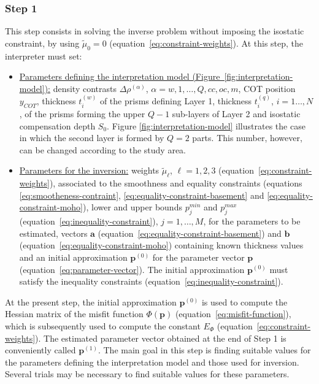 \documentclass[manuscript]{geophysics}
\begin{document}
\subsubsection{Step 1}

This step consists in solving the inverse problem without imposing 
the isostatic constraint, by using $\tilde{\mu}_{0} = 0$ 
(equation~\ref{eq:constraint-weights}). 
At this step, the interpreter must set:
\begin{itemize}
	\item \underline{Parameters defining the interpretation model
	(Figure~\ref{fig:interpretation-model}):} density contrasts $\Delta \rho^{(\alpha)}$, 
	$\alpha = w, 1, \dots, Q, cc, oc, m$, COT position $y_{COT}$, thickness $t^{(w)}_{i}$ 
	of the prisms defining Layer 1, thickness $t^{(q)}_{i}$, $i = 1 \dots, N$, of the prisms
	forming the upper $Q-1$ sub-layers of Layer 2 and isostatic compensation depth $S_{0}$. 
	Figure \ref{fig:interpretation-model} illustrates 
	the case in which the second layer is formed by $Q = 2$ parts. This number, however, 
	can be changed according to the study area.
	\item \underline{Parameters for the inversion:} weights $\tilde{\mu}_{\ell}$,
	$\ell = 1, 2, 3$ (equation~\ref{eq:constraint-weights}), associated to the 
	smoothness and equality constraints (equations \ref{eq:smootheness-contraint},
	\ref{eq:equality-constraint-basement} and \ref{eq:equality-constraint-moho}),
	lower and upper bounds $p_{j}^{min}$ and $p_{j}^{max}$
	(equation~\ref{eq:inequality-constraint}), $j = 1, \dots, M$,
	for the parameters to be estimated, vectors $\mathbf{a}$ 
	(equation~\ref{eq:equality-constraint-basement}) and $\mathbf{b}$
	(equation~\ref{eq:equality-constraint-moho}) containing known thickness values
	and an initial approximation $\mathbf{p}^{(0)}$ for the parameter vector $\mathbf{p}$
	(equation~\ref{eq:parameter-vector}). The initial approximation $\mathbf{p}^{(0)}$
	must satisfy the inequality constraints (equation~\ref{eq:inequality-constraint}).
\end{itemize}

At the present step, the initial approximation $\mathbf{p}^{(0)}$ is used to compute the 
Hessian matrix of the misfit function $\Phi(\mathbf{p})$ (equation~\ref{eq:misfit-function}),
which is subsequently used to compute the constant $E_{\Phi}$ (equation~\ref{eq:constraint-weights}).
The estimated parameter vector obtained at the end of Step 1 is conveniently called
$\mathbf{p}^{(1)}$. The main goal in this step is finding suitable values for the parameters
defining the interpretation model and those used for inversion. Several trials may be
necessary to find suitable values for these parameters.
\end{document}
